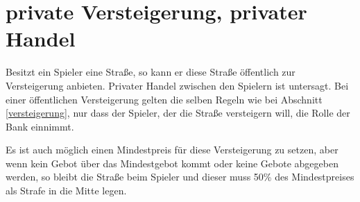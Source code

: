 \documentclass{article}
\begin{document}
	\section{private Versteigerung, privater Handel}
	Besitzt ein Spieler eine Straße, so kann er diese Straße öffentlich zur Versteigerung anbieten. Privater Handel zwischen den Spielern ist untersagt. Bei einer öffentlichen Versteigerung gelten die selben Regeln wie bei Abschnitt \ref{versteigerung}, nur dass der Spieler, der die Straße versteigern will, die Rolle der Bank einnimmt.
	
	Es ist auch möglich einen Mindestpreis für diese Versteigerung zu setzen, aber wenn kein Gebot über das Mindestgebot kommt oder keine Gebote abgegeben werden, so bleibt die Straße beim Spieler und dieser muss 50\% des Mindestpreises als Strafe in die Mitte legen.
	
	
\end{document}
